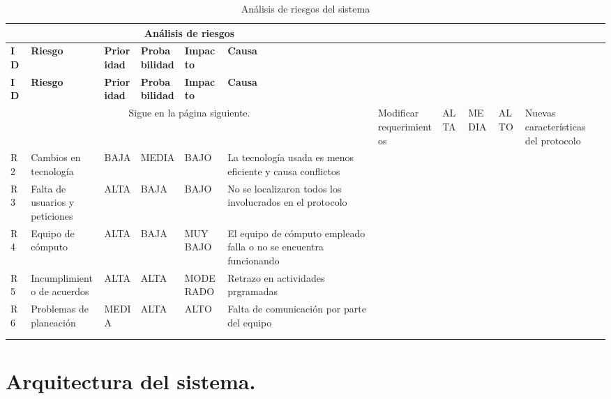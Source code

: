 \begin{longtable}{| p{1cm} | p{4cm} | p{2cm} | p{2.5cm} | p{2cm} | p{4cm} |}

\hline
\multicolumn{6}{|c|}{\textbf{Análisis de riesgos}} \\ \hline
\textbf{ID} &  \textbf{Riesgo} & \textbf{Prioridad} & \textbf{Probabilidad} & \textbf{Impacto} & \textbf{Causa}\\
\hline \hline
\endfirsthead

\hline
\textbf{ID} &  \textbf{Riesgo} & \textbf{Prioridad} & \textbf{Probabilidad} & \textbf{Impacto} & \textbf{Causa}\\
\hline \hline
\endhead

\multicolumn{6}{|c|}{Sigue en la página siguiente.}
\endfoot

\endlastfoot

R1 & Modificar requerimientos &  ALTA & MEDIA & ALTO & Nuevas características del protocolo \\ \hline
R2 & Cambios en tecnología & BAJA & MEDIA & BAJO & La tecnología usada es menos eficiente y causa conflictos \\ \hline
R3 & Falta de usuarios y peticiones & ALTA & BAJA &  BAJO & No se localizaron todos los involucrados en el protocolo \\ \hline
R4 & Equipo de cómputo & ALTA & BAJA & MUY BAJO & El equipo de cómputo empleado falla o no se encuentra funcionando \\ \hline
R5 & Incumplimiento de acuerdos & ALTA & ALTA & MODERADO & Retrazo en actividades prgramadas \\ \hline
R6 & Problemas de planeación & MEDIA & ALTA & ALTO & Falta de comunicación por parte del equipo \\ \hline

\\ \hline
\caption{Análisis de riesgos del sistema}
\label{Análisis de riesgos }
\end{longtable}


\section{Arquitectura del sistema. }

